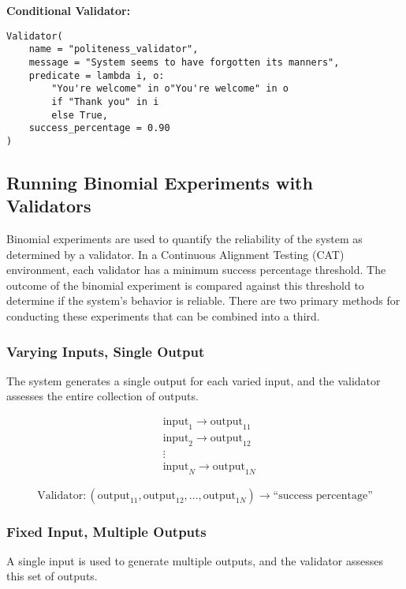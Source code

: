 \documentclass{article}
\begin{document}
\vspace{1em}
\textbf{Conditional Validator:}
\begin{lstlisting}
Validator(
    name = "politeness_validator",
    message = "System seems to have forgotten its manners",
    predicate = lambda i, o: 
        "You're welcome" in o"You're welcome" in o
        if "Thank you" in i
        else True,
    success_percentage = 0.90
)
\end{lstlisting}


\subsection{Running Binomial Experiments with Validators}

Binomial experiments are used to quantify the reliability of the system as determined by a validator. In a Continuous Alignment Testing (CAT) environment, each validator has a minimum success percentage threshold. The outcome of the binomial experiment is compared against this threshold to determine if the system's behavior is reliable. There are two primary methods for conducting these experiments that can be combined into a third.

\subsubsection{Varying Inputs, Single Output}
The system generates a single output for each varied input, and the validator assesses the entire collection of outputs.

\begin{equation*}
\begin{aligned}
&\text{input}_1 \rightarrow \text{output}_{11} \\
&\text{input}_2 \rightarrow \text{output}_{12} \\
&\vdots \\
&\text{input}_N \rightarrow \text{output}_{1N} 
\end{aligned}
\end{equation*}

\begin{equation*}
\text{Validator}: (\text{output}_{11}, \text{output}_{12}, \ldots, \text{output}_{1N}) \rightarrow \text{``success percentage''}
\end{equation*}

\subsubsection{Fixed Input, Multiple Outputs}
A single input is used to generate multiple outputs, and the validator assesses this set of outputs.
\end{document}
